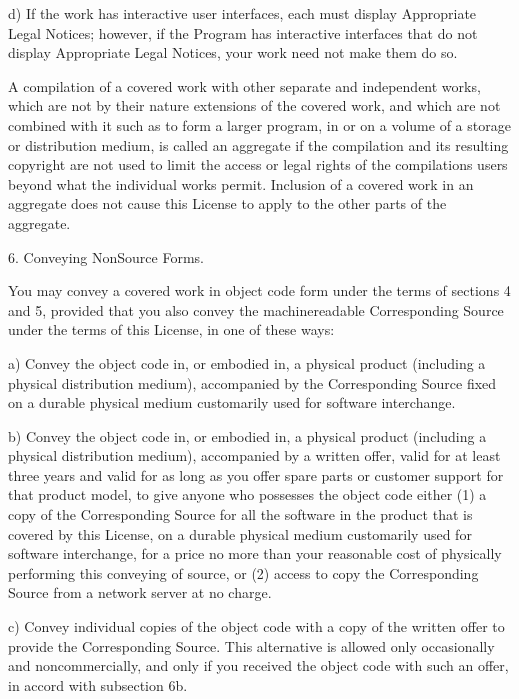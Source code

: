 \documentclass[a4paper,10pt,english]{sphinxmanual}
\begin{document}
\begin{sphinxVerbatim}[commandchars=\\\{\}]
    d) If the work has interactive user interfaces, each must display
    Appropriate Legal Notices; however, if the Program has interactive
    interfaces that do not display Appropriate Legal Notices, your
    work need not make them do so.

  A compilation of a covered work with other separate and independent
works, which are not by their nature extensions of the covered work,
and which are not combined with it such as to form a larger program,
in or on a volume of a storage or distribution medium, is called an
\PYGZdq{}aggregate\PYGZdq{} if the compilation and its resulting copyright are not
used to limit the access or legal rights of the compilation\PYGZsq{}s users
beyond what the individual works permit.  Inclusion of a covered work
in an aggregate does not cause this License to apply to the other
parts of the aggregate.

  6. Conveying Non\PYGZhy{}Source Forms.

  You may convey a covered work in object code form under the terms
of sections 4 and 5, provided that you also convey the
machine\PYGZhy{}readable Corresponding Source under the terms of this License,
in one of these ways:

    a) Convey the object code in, or embodied in, a physical product
    (including a physical distribution medium), accompanied by the
    Corresponding Source fixed on a durable physical medium
    customarily used for software interchange.

    b) Convey the object code in, or embodied in, a physical product
    (including a physical distribution medium), accompanied by a
    written offer, valid for at least three years and valid for as
    long as you offer spare parts or customer support for that product
    model, to give anyone who possesses the object code either (1) a
    copy of the Corresponding Source for all the software in the
    product that is covered by this License, on a durable physical
    medium customarily used for software interchange, for a price no
    more than your reasonable cost of physically performing this
    conveying of source, or (2) access to copy the
    Corresponding Source from a network server at no charge.

    c) Convey individual copies of the object code with a copy of the
    written offer to provide the Corresponding Source.  This
    alternative is allowed only occasionally and noncommercially, and
    only if you received the object code with such an offer, in accord
    with subsection 6b.


\end{sphinxVerbatim}
\end{document}

